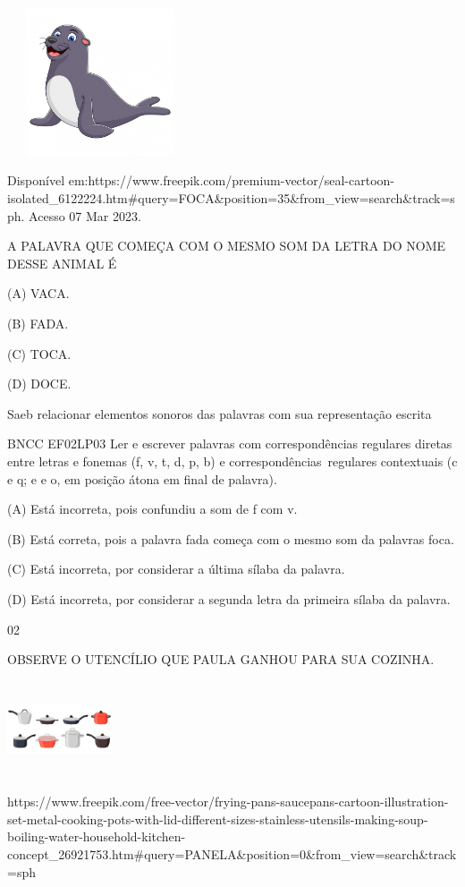 {{{{{{\includegraphics[width=2.16528in,height=1.72778in]{media/image139.jpeg}

Disponível
em:https://www.freepik.com/premium-vector/seal-cartoon-isolated\_6122224.htm\#query=FOCA\&position=35\&from\_view=search\&track=sph.
Acesso 07 Mar 2023.

A PALAVRA QUE COMEÇA COM O MESMO SOM DA LETRA DO NOME DESSE ANIMAL É

(A) VACA.

(B) FADA.

(C) TOCA.

(D) DOCE.

Saeb relacionar elementos sonoros das palavras com sua representação
escrita

BNCC EF02LP03 Ler e escrever palavras com correspondências regulares
diretas entre letras e fonemas (f, v, t, d, p, b) e
correspondências~regulares contextuais (c e q; e e o, em posição átona
em final de palavra).

\protect\hypertarget{_Hlk129501253}{}{}(A) Está incorreta, pois
confundiu a som de f com v.

(B) Está correta, pois a palavra fada começa com o mesmo som da palavras
foca.

(C) Está incorreta, por considerar a última sílaba da palavra.

(D) Está incorreta, por considerar a segunda letra da primeira sílaba da
palavra.

\num{02}

OBSERVE O UTENCÍLIO QUE PAULA GANHOU PARA SUA COZINHA.

\includegraphics[width=1.22222in,height=1.11389in]{media/image19.jpeg}

https://www.freepik.com/free-vector/frying-pans-saucepans-cartoon-illustration-set-metal-cooking-pots-with-lid-different-sizes-stainless-utensils-making-soup-boiling-water-household-kitchen-concept\_26921753.htm\#query=PANELA\&position=0\&from\_view=search\&track=sph

}}}}}}
